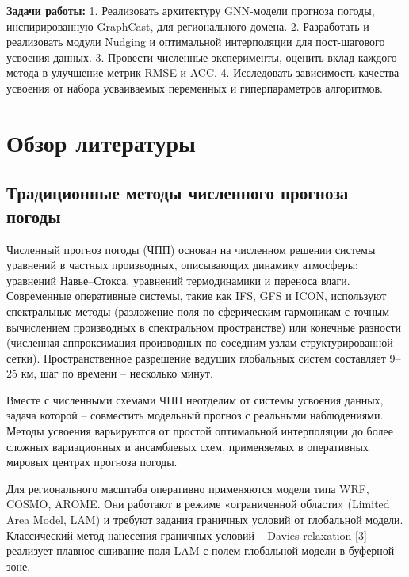 \documentclass[14pt,a4paper]{extarticle}
\numberwithin{table}{section}
\numberwithin{figure}{section}
\numberwithin{equation}{section}
\begin{document}
\textbf{Задачи работы:} 1. Реализовать архитектуру GNN-модели прогноза
погоды, инспирированную GraphCast, для регионального домена. 2.
Разработать и реализовать модули Nudging и оптимальной интерполяции для
пост-шагового усвоения данных. 3. Провести численные эксперименты,
оценить вклад каждого метода в улучшение метрик RMSE и ACC.
4. Исследовать зависимость качества усвоения от набора усваиваемых
переменных и гиперпараметров алгоритмов.


\newpage

\section{Обзор литературы}

\subsection{Традиционные методы численного прогноза погоды}\label{ux442ux440ux430ux434ux438ux446ux438ux43eux43dux43dux44bux435-ux43cux435ux442ux43eux434ux44b-ux447ux438ux441ux43bux435ux43dux43dux43eux433ux43e-ux43fux440ux43eux433ux43dux43eux437ux430-ux43fux43eux433ux43eux434ux44b}

Численный прогноз погоды (ЧПП) основан на численном решении системы
уравнений в частных производных, описывающих динамику атмосферы:
уравнений Навье--Стокса, уравнений термодинамики и переноса влаги.
Современные оперативные системы, такие как IFS, GFS и ICON, используют
спектральные методы (разложение поля по
сферическим гармоникам с точным вычислением производных в спектральном
пространстве) или конечные разности (численная аппроксимация
производных по соседним узлам структурированной сетки).
Пространственное разрешение ведущих глобальных систем составляет
9--25 км, шаг по времени -- несколько минут.

Вместе с численными схемами ЧПП неотделим от системы усвоения данных, задача которой -- совместить модельный прогноз
с реальными наблюдениями. Методы усвоения варьируются от простой
оптимальной интерполяции до более сложных вариационных и ансамблевых
схем, применяемых в оперативных мировых центрах прогноза погоды.

Для регионального масштаба оперативно применяются модели типа WRF,
COSMO, AROME. Они работают в режиме «ограниченной области» (Limited Area
Model, LAM) и требуют задания граничных условий от глобальной модели.
Классический метод нанесения граничных условий -- Davies relaxation
{[}3{]} -- реализует плавное сшивание поля LAM с полем глобальной
модели в буферной зоне.
\end{document}
